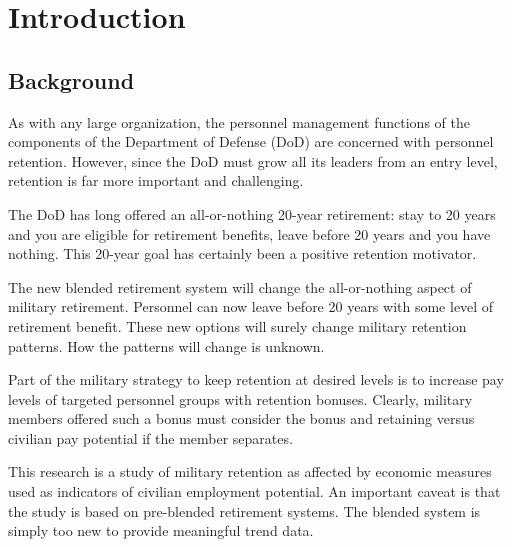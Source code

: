 \documentclass[12pt,letterpaper,toc=flat,oneside]{report}
\theoremstyle{definition}
\theoremstyle{definition}
\theoremstyle{definition}
\theoremstyle{remark}
\begin{document}
\listoftables
\newpage
\renewcommand\listfigurename{\centering \Large List of Figures}
\listoffigures
\newpage
\setcounter{chapter}{0}
\doublespacing
\setcounter{page}{1}
	\renewcommand{\thepage}{\arabic{page}}
\hypertarget{introduction}{%
\chapter{Introduction}\label{introduction}}

\hypertarget{background}{%
\section{Background}\label{background}}

As with any large organization, the personnel management functions of
the components of the Department of Defense (DoD) are concerned with
personnel retention. However, since the DoD must grow all its leaders
from an entry level, retention is far more important and challenging.

The DoD has long offered an all-or-nothing 20-year retirement: stay to
20 years and you are eligible for retirement benefits, leave before 20
years and you have nothing. This 20-year goal has certainly been a
positive retention motivator.

The new blended retirement system will change the all-or-nothing aspect
of military retirement. Personnel can now leave before 20 years with
some level of retirement benefit. These new options will surely change
military retention patterns. How the patterns will change is unknown.

Part of the military strategy to keep retention at desired levels is to
increase pay levels of targeted personnel groups with retention bonuses.
Clearly, military members offered such a bonus must consider the bonus
and retaining versus civilian pay potential if the member separates.

This research is a study of military retention as affected by economic
measures used as indicators of civilian employment potential. An
important caveat is that the study is based on pre-blended retirement
systems. The blended system is simply too new to provide meaningful
trend data.
\end{document}
